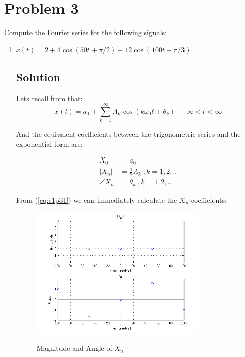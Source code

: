 \section*{Problem 3}
Compute the Fourier series for the following signals:

\begin{enumerate}
\item $x(t) = 2 + 4 \cos(50t + \pi/2) + 12 \cos(100t-\pi/3)$
\subsection*{Solution}
Lets recall from \cite{kamen2000fundamentals} that:
\begin{equation*}
x(t) = a_0 + \displaystyle\sum_{k=1}^{\infty} A_k \cos(k \omega_0 t + \theta_k) \;
-\infty < t < \infty 
\end{equation*} 

And the equivalent coefficients between the trigonometric series and the 
exponential form are:

\begin{equation}
\begin{aligned}
X_0 &= a_0 \\
|X_n| &= \frac{1}{2} A_k \; , k=1,2,.. \\
\angle X_n &= \theta_k \; , k=1,2,..
\label{eq:c1p31}
\end{aligned}
\end{equation} 

From (\ref{eq:c1p31}) we can immediately calculate the $X_n$ coefficients:

\begin{figure}[H]
\caption{Magnitude and Angle of $X_n$}
\centering
\includegraphics[width=0.8\textwidth]{figs/c1p3a.png}
\label{fig:c1p3a}
\end{figure} 


\end{enumerate}

